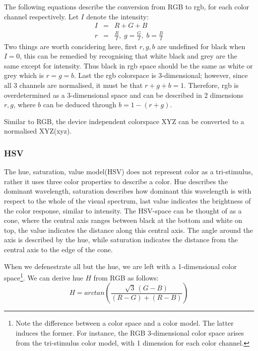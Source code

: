 \documentclass[a4paper,11pt]{article}
\begin{document}
The following equations describe the conversion from RGB to rgb, for each color channel respectively.  Let $I$ denote the intensity:
\begin{eqnarray}
\label{eq:rgb}
I &=& R+G+B \\
r &=& \frac{R}{I},\; g = \frac{G}{I},\; b = \frac{B}{I}
\end{eqnarray}
Two things are worth concidering here, first $r,g,b$ are undefined for black when $I=0$, this can be remedied by recognising that white black and grey are the same except for intensity. Thus black in rgb space should be the same as white or grey which is $r=g=b$. Last the rgb colorspace is 3-dimensional; however, since all 3 channels are normalised, it must be that $r+g+b=1$. Therefore, rgb is overdetermined as a 3-dimensional space and can be described in 2 dimensions $r,g$, where $b$ can be deduced through $b=1-(r+g)$.

Similar to RGB, the device independent colorspace XYZ can be converted to a normalised XYZ(xyz).		

\subsubsection{HSV}

The hue, saturation, value model(HSV) does not represent color as a tri-stimulus, rather it uses three color properties to describe a color. Hue describes the dominant wavelength, saturation describes how dominant this wavelength is with respect to the whole of the visual spectrum, last value indicates the brightness of the color response, similar to intensity. The HSV-space can be thought of as a cone, where the central axis ranges between black at the bottom and white on top, the value indicates the distance along this central axis. The angle around the axis is described by the hue, while saturation indicates the distance from the central axis to the edge of the cone. 

When we defenestrate all but the hue, we are left with a 1-dimensional color space\footnote{Note the difference between a color space and a color model. The latter induces the former. For instance, the RGB 3-dimensional color space arises from the tri-stimulus color model, with 1 dimension for each color channel.}.  We can derive hue $H$ from RGB as follows:
\begin{equation}
\label{eq:hue}
H = arctan\left(\frac{\sqrt{3}\,(G-B)}{(R-G)+(R-B)}\right)
\end{equation} 
\end{document}
